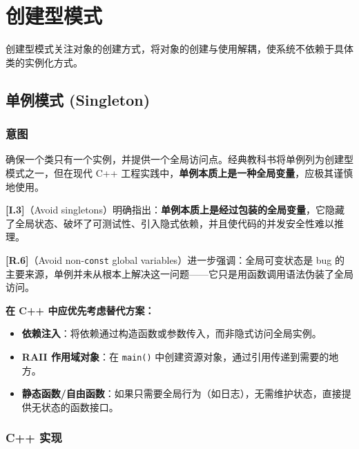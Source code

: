 \documentclass[12pt,a4paper,fontset=fandol]{ctexbook}
\newcommand{\guideref}[1]{\textbf{\textcolor{blue!70!black}{[#1]}}}
\begin{document}
\part{创建型模式}

创建型模式关注对象的创建方式，将对象的创建与使用解耦，使系统不依赖于具体类的实例化方式。

\chapter{单例模式 (Singleton)}

\section{意图}

确保一个类只有一个实例，并提供一个全局访问点。经典教科书将单例列为创建型模式之一，但在现代 C++ 工程实践中，\textbf{单例本质上是一种全局变量}，应极其谨慎地使用。

\begin{warning}[title={Core Guidelines 立场：慎用单例}]
\guideref{I.3}（Avoid singletons）明确指出：\textbf{单例本质上是经过包装的全局变量}，它隐藏了全局状态、破坏了可测试性、引入隐式依赖，并且使代码的并发安全性难以推理。

\guideref{R.6}（Avoid non-\texttt{const} global variables）进一步强调：全局可变状态是 bug 的主要来源，单例并未从根本上解决这一问题——它只是用函数调用语法伪装了全局访问。

\textbf{在 C++ 中应优先考虑替代方案：}
\begin{itemize}
  \item \textbf{依赖注入}：将依赖通过构造函数或参数传入，而非隐式访问全局实例。
  \item \textbf{RAII 作用域对象}：在 \texttt{main()} 中创建资源对象，通过引用传递到需要的地方。
  \item \textbf{静态函数/自由函数}：如果只需要全局行为（如日志），无需维护状态，直接提供无状态的函数接口。
\end{itemize}
\end{warning}

\section{C++ 实现}
\end{document}
